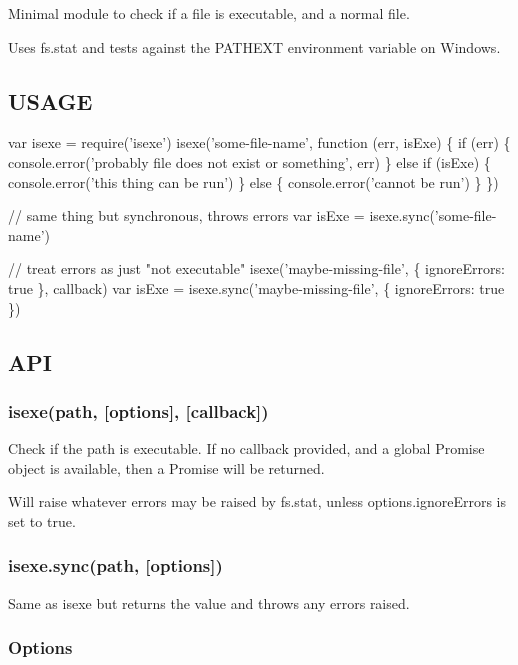 Minimal module to check if a file is executable, and a normal file.

Uses {\ttfamily fs.\+stat} and tests against the {\ttfamily P\+A\+T\+H\+E\+XT} environment variable on Windows.

\subsection*{U\+S\+A\+GE}


\begin{DoxyCode}
var isexe = require('isexe')
isexe('some-file-name', function (err, isExe) \{
  if (err) \{
    console.error('probably file does not exist or something', err)
  \} else if (isExe) \{
    console.error('this thing can be run')
  \} else \{
    console.error('cannot be run')
  \}
\})

// same thing but synchronous, throws errors
var isExe = isexe.sync('some-file-name')

// treat errors as just "not executable"
isexe('maybe-missing-file', \{ ignoreErrors: true \}, callback)
var isExe = isexe.sync('maybe-missing-file', \{ ignoreErrors: true \})
\end{DoxyCode}


\subsection*{A\+PI}

\subsubsection*{{\ttfamily isexe(path, \mbox{[}options\mbox{]}, \mbox{[}callback\mbox{]})}}

Check if the path is executable. If no callback provided, and a global {\ttfamily Promise} object is available, then a Promise will be returned.

Will raise whatever errors may be raised by {\ttfamily fs.\+stat}, unless {\ttfamily options.\+ignore\+Errors} is set to true.

\subsubsection*{{\ttfamily isexe.\+sync(path, \mbox{[}options\mbox{]})}}

Same as {\ttfamily isexe} but returns the value and throws any errors raised.

\subsubsection*{Options}


